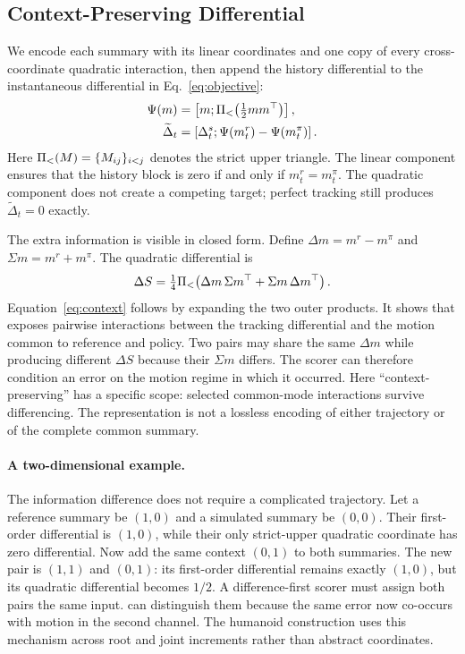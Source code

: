 \subsection{Context-Preserving Differential}

We encode each summary with its linear coordinates and one copy of every
cross-coordinate quadratic interaction, then append the history differential
to the instantaneous differential in Eq.~\eqref{eq:objective}:
\begin{equation}
 \begin{aligned}
 \Psi(m)&=\left[m;\Pi_{<}\!\left(\tfrac12mm^\top\right)\right],\\
 \widetilde\Delta_t&=
 \left[\Delta_t^s;\Psi(m_t^r)-\Psi(m_t^\pi)\right].
 \end{aligned}
 \label{eq:representation}
\end{equation}
Here $\Pi_{<}(M)=\{M_{ij}\}_{i<j}$ denotes the strict upper triangle.
The linear component ensures that the history block is zero if and only if
$m_t^r=m_t^\pi$.  The quadratic component does not create a competing target;
perfect tracking still produces $\widetilde\Delta_t=0$ exactly.

The extra information is visible in closed form.  Define
$\Delta m=m^r-m^\pi$ and $\Sigma m=m^r+m^\pi$.  The quadratic differential is
\begin{equation}
 \Delta S
 =\tfrac14\Pi_{<}\!\left(
 \Delta m\,\Sigma m^\top+\Sigma m\,\Delta m^\top\right).
 \label{eq:context}
\end{equation}
Equation~\eqref{eq:context} follows by expanding the two outer products.  It
shows that \method{} exposes pairwise interactions between the tracking
differential and the motion common to reference and policy.  Two pairs may
share the same $\Delta m$ while producing different $\Delta S$ because their
$\Sigma m$ differs.  The scorer can therefore condition an error on the motion
regime in which it occurred.
Here ``context-preserving'' has a specific scope: selected common-mode
interactions survive differencing.  The representation is not a lossless
encoding of either trajectory or of the complete common summary.

\paragraph{A two-dimensional example.}
The information difference does not require a complicated trajectory.  Let a
reference summary be $(1,0)$ and a simulated summary be $(0,0)$.  Their
first-order differential is $(1,0)$, while their only strict-upper quadratic
coordinate has zero differential.  Now add the same context $(0,1)$ to both
summaries.  The new pair is $(1,1)$ and $(0,1)$: its first-order differential
remains exactly $(1,0)$, but its quadratic differential becomes $1/2$.  A
difference-first scorer must assign both pairs the same input.  \method{} can
distinguish them because the same error now co-occurs with motion in the second
channel.  The humanoid construction uses this mechanism across root and joint
increments rather than abstract coordinates.

